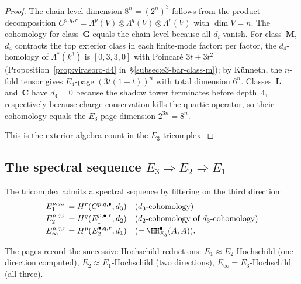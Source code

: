 \begin{proof}
The chain-level dimension \(8^n=(2^n)^3\) follows from the product decomposition \(C^{p,q,r}=\Lambda^p(V)\otimes\Lambda^q(V)\otimes\Lambda^r(V)\) with \(\dim V=n\). The cohomology for class~\(\mathbf G\) equals the chain level because all \(d_i\) vanish. For class~\(\mathbf M\), \(d_4\) contracts the top exterior class in each finite-mode factor: per factor, the \(d_4\)-homology of \(\Lambda^*(k^3)\) is \([0,3,3,0]\) with Poincar\'e \(3t+3t^2\) (Proposition~\ref{prop:virasoro-d4} in~\S\ref{subsec:e3-bar-class-m}); by K\"unneth, the \(n\)-fold tensor gives \(E_4\)-page \((3t(1+t))^n\) with total dimension \(6^n\). Classes~\(\mathbf L\) and~\(\mathbf C\) have \(d_4=0\) because the shadow tower terminates before depth~\(4\), respectively because charge conservation kills the quartic operator, so their cohomology equals the \(E_3\)-page dimension \(2^{3n}=8^n\).

This is the exterior-algebra count in the \(E_3\) tricomplex.
\end{proof}

\subsection{The spectral sequence \texorpdfstring{$E_3 \Rightarrow E_2 \Rightarrow E_1$}{E-3 => E-2 => E-1}}
\label{subsec:e3-spectral-sequence}

The tricomplex admits a spectral sequence by filtering on the third direction:
\begin{align*}
 E_1^{p,q,r} &= H^r(C^{p,q,\bullet}, d_3) & &\text{($d_3$-cohomology)} \\
 E_2^{p,q,r} &= H^q(E_1^{p,\bullet,r}, d_2) & &\text{($d_2$-cohomology of $d_3$-cohomology)} \\
 E_\infty^{p,q,r} &= H^p(E_2^{\bullet,q,r}, d_1) & &\text{($= \HH^\bullet_{E_3}(A,A)$).}
\end{align*}

The pages record the successive Hochschild reductions: $E_1 \approx E_2$-Hochschild (one direction computed), $E_2 \approx E_1$-Hochschild (two directions), $E_\infty = E_3$-Hochschild (all three).

